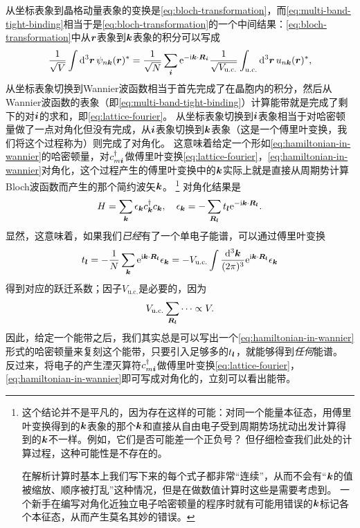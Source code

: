 从坐标表象到晶格动量表象的变换是\eqref{eq:bloch-transformation}，而\eqref{eq:multi-band-tight-binding}相当于是\eqref{eq:bloch-transformation}的一个中间结果：\eqref{eq:bloch-transformation}中从$\vb*{r}$表象到$\vb*{k}$表象的积分可以写成
\[
    \frac{1}{\sqrt{V}} \int \dd[3]{\vb*{r}} \psi_{n \vb*{k}}(\vb*{r})^* = \frac{1}{\sqrt{N}} \sum_{\vb*{i}} \mathrm{e}^{- \mathrm{i} \vb*{k} \cdot \vb*{R}_{\vb*{i}}} \frac{1}{\sqrt{V_\text{u.c.}}} \int_\text{u.c.} \dd[3]{\vb*{r}} u_{n \vb*{k}}(\vb*{r})^* ,
\]
从坐标表象切换到Wannier波函数相当于首先完成了在晶胞内的积分，然后从Wannier波函数的表象（即\eqref{eq:multi-band-tight-binding}）计算能带就是完成了剩下的对$\vb*{i}$的求和，即\eqref{eq:lattice-fourier}。
从坐标表象切换到$\vb*{i}$表象相当于对哈密顿量做了一点对角化但没有完成，从$\vb*{i}$表象切换到$\vb*{k}$表象（这是一个傅里叶变换，我们将这个过程称为）则完成了对角化。
这意味着给定一个形如\eqref{eq:hamiltonian-in-wannier}的哈密顿量，对$c_{m \vb*{i}}^\dagger$做傅里叶变换\eqref{eq:lattice-fourier}，\eqref{eq:hamiltonian-in-wannier}对角化，这个过程产生的傅里叶变换中的$\vb*{k}$实际上就是直接从周期势计算Bloch波函数而产生的那个简约波矢$\vb*{k}$。%
\footnote{
    这个结论并不是平凡的，因为存在这样的可能：对同一个能量本征态，用傅里叶变换得到的$\vb*{k}$表象的那个$\vb*{k}$和直接从自由电子受到周期势场扰动出发计算得到的$\vb*{k}$不一样。例如，它们是否可能差一个正负号？
    但仔细检查我们此处的计算过程，这种可能性是不存在的。

    在解析计算时基本上我们写下来的每个式子都非常“连续”，从而不会有“$\vb*{k}$的值被缩放、顺序被打乱”这种情况，但是在做数值计算时这些是需要考虑到。
    一个新手在编写对角化近独立电子哈密顿量的程序时就有可能用错误的$\vb*{k}$标记各个本征态，从而产生莫名其妙的错误。
}%
对角化结果是
\begin{equation}
    H = \sum_{\vb*{k}} \epsilon_{\vb*{k}} c^\dagger_{\vb*{k}} c_{\vb*{k}}, \quad \epsilon_{\vb*{k}} = - \sum_{\vb*{R}_{\vb*{l}}} t_{\vb*{l}} \mathrm{e}^{- \mathrm{i} \vb*{k} \cdot \vb*{R}_{\vb*{l}}} .
\end{equation}
显然，这意味着，如果我们\emph{已经}有了一个单电子能谱，可以通过傅里叶变换
\begin{equation}
    t_{\vb*{l}} = - \frac{1}{N} \sum_{\vb*{k}} \mathrm{e}^{\mathrm{i} \vb*{k} \cdot \vb*{R}_{\vb*{l}}} \epsilon_{\vb*{k}} = - V_\text{u.c.} \int \frac{\dd[3]{\vb*{k}}}{(2\pi)^3} \mathrm{e}^{\mathrm{i} \vb*{k} \cdot \vb*{R}_{\vb*{l}}} \epsilon_{\vb*{k}}
    \label{eq:from-spectrum-to-tight-binding}
\end{equation}
得到对应的跃迁系数；因子$V_\text{u.c.}$是必要的，因为
\[
    V_\text{u.c.} \sum_{\vb*{R}_{\vb*{l}}} \cdots \propto V.
\]
因此，给定一个能带之后，我们其实总是可以写出一个\eqref{eq:hamiltonian-in-wannier}形式的哈密顿量来复刻这个能带，只要引入足够多的$t_{\vb*{l}}$，就能够得到\emph{任何}能谱。
反过来，将电子的产生湮灭算符$c_{m \vb*{i}}^\dagger$做傅里叶变换\eqref{eq:lattice-fourier}，\eqref{eq:hamiltonian-in-wannier}即可写成对角化的，立刻可以看出能带。

